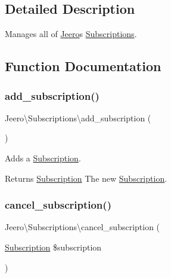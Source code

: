 \subsection{Detailed Description}
Manages all of \hyperlink{namespaceJeero}{Jeero}\textquotesingle{}s \hyperlink{namespaceJeero_1_1Subscriptions}{Subscriptions}. 

\subsection{Function Documentation}
\mbox{\label{namespaceJeero_1_1Subscriptions_a7fefeb0c9fc00b9b47bd9da69da6ecbd}} 
\subsubsection{\texorpdfstring{add\+\_\+subscription()}{add\_subscription()}}
{\footnotesize\ttfamily Jeero\textbackslash{}\+Subscriptions\textbackslash{}add\+\_\+subscription (\begin{DoxyParamCaption}{ }\end{DoxyParamCaption})}

Adds a \hyperlink{classJeero_1_1Subscriptions_1_1Subscription}{Subscription}.

\begin{DoxyReturn}{Returns}
\hyperlink{classJeero_1_1Subscriptions_1_1Subscription}{Subscription} The new \hyperlink{classJeero_1_1Subscriptions_1_1Subscription}{Subscription}. 
\end{DoxyReturn}
\mbox{\label{namespaceJeero_1_1Subscriptions_a9d1e85f0c5a276290e41bc794ae9da66}} 
\subsubsection{\texorpdfstring{cancel\+\_\+subscription()}{cancel\_subscription()}}
{\footnotesize\ttfamily Jeero\textbackslash{}\+Subscriptions\textbackslash{}cancel\+\_\+subscription (\begin{DoxyParamCaption}\item[{\hyperlink{classJeero_1_1Subscriptions_1_1Subscription}{Subscription}}]{\$subscription }\end{DoxyParamCaption})}

